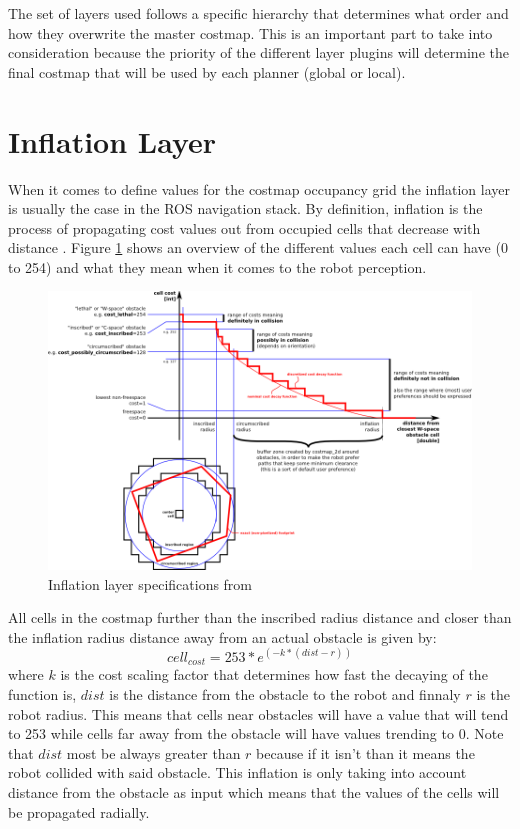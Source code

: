 The set of layers used follows a specific hierarchy that determines what order and how they overwrite the master costmap. This is an important part to take into consideration because the priority of the different layer plugins will determine the final costmap that will be used by each planner (global or local).
\section{Inflation Layer}
When it comes to define values for the costmap occupancy grid the inflation layer is usually the case in the \ac{ROS} navigation stack. By definition, inflation is the process of propagating cost values out from occupied cells that decrease with distance \cite{costmap2d}. Figure \ref{fig::inflation} shows an overview of the different values each cell can have (0 to 254) and what they mean when it comes to the robot perception. 
\begin{figure}[ht!] 
\centerline{\includegraphics [width=1.0 \textwidth]{imgs/chapter6/costmapspec.png}}
\caption[Inflation layer specifications]{Inflation layer specifications from \cite{costmap2d}}
\label{fig::inflation}
\end{figure}

All cells in the costmap further than the inscribed radius distance and closer than the inflation radius distance away from an actual obstacle is given by:
\begin{equation}
    cell_{cost}=253*e^{(-k * (dist - r)) }
\end{equation}
where $k$ is the cost scaling factor  that determines how fast the decaying of the function is, $dist$ is the distance from the obstacle to the robot and finnaly $r$ is the robot radius. 
This means that cells near obstacles will have a value that will tend to 253 while cells far away from the obstacle will have values trending to 0. Note that $dist$ most be always greater than $r$ because if it isn't than it means the robot collided with said obstacle.
This inflation is only taking into account distance from the obstacle as input which means that the values of the cells will be propagated radially.

